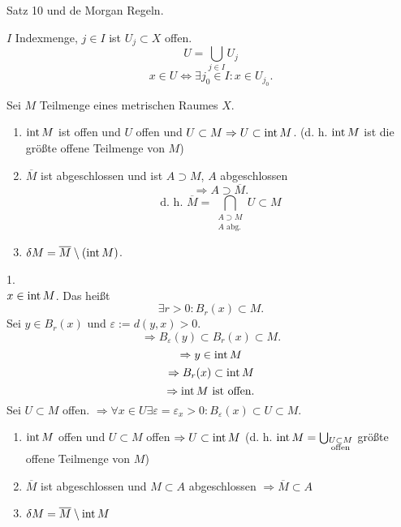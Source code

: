 \documentclass[../ana2.tex]{subfiles}
\begin{document}
\begin{bew}
    Satz 10 und de Morgan Regeln.
\end{bew}
\begin{bem}
    \( I \) Indexmenge, \( j \in I \) ist 
    \( U_j \subset X \) offen.
    \[ U = \bigcup_{j\in I} U_j \]
    \[ x \in U \Leftrightarrow \exists j_0 \in I: 
    x \in U_{j_0}. \]
\end{bem}
\begin{satz}
    Sei \( M \) Teilmenge eines metrischen 
    Raumes \( X \).
    \begin{enumerate}
        \item \( \operatorname{int} M \) ist offen und \( U \) offen 
        und \( U \subset M \Rightarrow U \subset \operatorname{int} M \).
        (d. h. \( \operatorname{int} M \) ist die größte offene Teilmenge 
        von \(M\))
        \item \( \overline{M} \) ist abgeschlossen und ist 
        \(A \supset M \), \( A \) abgeschlossen 
        \[ \Rightarrow A \supset \overline{M}. \]
        \[ \text{d. h. } \overline{M} 
        = \bigcap_{\substack{A \supset M\\A \text{ abg.}}} 
        U \subset M \]
        \item \( \delta M = \overline{M} \setminus (\operatorname{int} M) \).
    \end{enumerate}
\end{satz}
\begin{bew}
    1.\\
    \( x \in \operatorname{int} M \). Das heißt 
    \[ \exists r > 0: B_r(x) \subset M. \]
    Sei \( y \in B_r(x) \) und \( \varepsilon := d(y,x) > 0 \).
    \[ \Rightarrow B_\varepsilon(y) \subset B_r(x) 
    \subset M. \]
    \[ \Rightarrow y \in \operatorname{int} M \]
    \[ \Rightarrow B_r(x) \subset \operatorname{int} M \]
    \[ \Rightarrow \operatorname{int} M \text{ ist offen}. \]
    Sei \( U \subset M \) offen. 
    \( \Rightarrow \forall x \in U 
    \exists \varepsilon = \varepsilon_x > 0: 
    B_\varepsilon(x) \subset U \subset M \).

\end{bew}
\begin{satz*}\leavevmode
    \begin{enumerate}
        \item \( \operatorname{int} M \) offen und 
        \( U \subset M \) offen \( \Rightarrow U \subset \operatorname{int} M \)
        (d. h. \( \operatorname{int} M = \bigcup_{\substack{U \subset M \\\text{offen}}} \) 
        größte offene Teilmenge von \(M\))
        \item \( \overline{M} \) ist abgeschlossen und 
        \( M \subset A \) abgeschlossen 
        \( \Rightarrow \overline{M} \subset A \)
        \item \( \delta M = \overline{M} \setminus \operatorname{int} M \)
    \end{enumerate}
\end{satz*}
\end{document}

